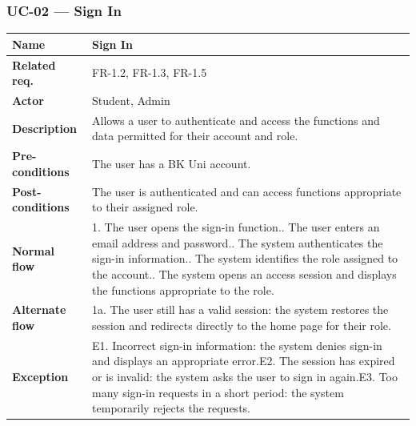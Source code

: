 \subsubsection{UC-02 --- Sign In}
\begin{longtable}{|p{}|p{}|}
\hline
\textbf{Name} & Sign In \\
\hline
\textbf{Related req.} & FR-1.2, FR-1.3, FR-1.5 \\
\hline
\textbf{Actor} & Student, Admin \\
\hline
\textbf{Description} & Allows a user to authenticate and access the functions and data permitted for their account and role. \\
\hline
\textbf{Pre-conditions} & The user has a BK Uni account. \\
\hline
\textbf{Post-conditions} & The user is authenticated and can access functions appropriate to their assigned role. \\
\hline
\textbf{Normal flow} & 1. The user opens the sign-in function.\newline 2. The user enters an email address and password.\newline 3. The system authenticates the sign-in information.\newline 4. The system identifies the role assigned to the account.\newline 5. The system opens an access session and displays the functions appropriate to the role. \\
\hline
\textbf{Alternate flow} & 1a. The user still has a valid session: the system restores the session and redirects directly to the home page for their role. \\
\hline
\textbf{Exception} & E1. Incorrect sign-in information: the system denies sign-in and displays an appropriate error.\newline E2. The session has expired or is invalid: the system asks the user to sign in again.\newline E3. Too many sign-in requests in a short period: the system temporarily rejects the requests. \\
\hline
\end{longtable}

